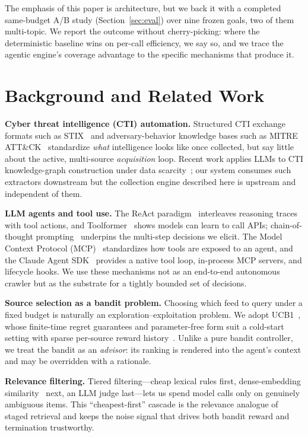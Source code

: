 \documentclass[conference]{IEEEtran}
\begin{document}
The emphasis of this paper is architecture, but we back it with a completed same-budget A/B study (Section~\ref{sec:eval}) over nine frozen goals, two of them multi-topic. We report the outcome without cherry-picking: where the deterministic baseline wins on per-call efficiency, we say so, and we trace the agentic engine's coverage advantage to the specific mechanisms that produce it.

\section{Background and Related Work}

\textbf{Cyber threat intelligence (CTI) automation.} Structured CTI exchange formats such as STIX~\cite{stix} and adversary-behavior knowledge bases such as MITRE ATT\&CK~\cite{strom2018attack} standardize \emph{what} intelligence looks like once collected, but say little about the active, multi-source \emph{acquisition} loop. Recent work applies LLMs to CTI knowledge-graph construction under data scarcity~\cite{cheng2024ctinexus}; our system consumes such extractors downstream but the collection engine described here is upstream and independent of them.

\textbf{LLM agents and tool use.} The ReAct paradigm~\cite{yao2023react} interleaves reasoning traces with tool actions, and Toolformer~\cite{schick2023toolformer} shows models can learn to call APIs; chain-of-thought prompting~\cite{wei2022cot} underpins the multi-step decisions we elicit. The Model Context Protocol (MCP)~\cite{anthropicmcp} standardizes how tools are exposed to an agent, and the Claude Agent SDK~\cite{claudeagentsdk} provides a native tool loop, in-process MCP servers, and lifecycle hooks. We use these mechanisms not as an end-to-end autonomous crawler but as the substrate for a tightly bounded set of decisions.

\textbf{Source selection as a bandit problem.} Choosing which feed to query under a fixed budget is naturally an exploration--exploitation problem. We adopt UCB1~\cite{auer2002ucb}, whose finite-time regret guarantees and parameter-free form suit a cold-start setting with sparse per-source reward history~\cite{lattimore2020bandit}. Unlike a pure bandit controller, we treat the bandit as an \emph{advisor}: its ranking is rendered into the agent's context and may be overridden with a rationale.

\textbf{Relevance filtering.} Tiered filtering---cheap lexical rules first, dense-embedding similarity~\cite{karpukhin2020dpr} next, an LLM judge last---lets us spend model calls only on genuinely ambiguous items. This ``cheapest-first'' cascade is the relevance analogue of staged retrieval and keeps the noise signal that drives both bandit reward and termination trustworthy.
\end{document}
